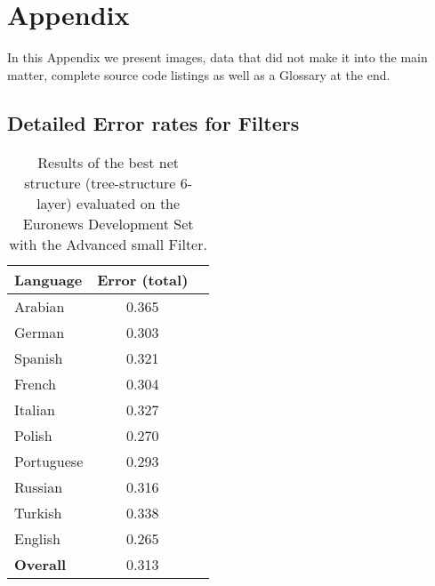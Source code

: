 


\chapter{Appendix}
\label{chap:appendix}
In this Appendix we present images, data that did not make it into the main matter, complete source code listings as well as a Glossary at the end.

\section{Detailed Error rates for Filters}

\begin{table}[!htbp]
\centering
\caption{Results of the best net structure (tree-structure 6-layer) evaluated on the Euronews Development Set with the Advanced small Filter.}
\label{tab:advanced}
\begin{tabular}{| l | c | r | }
	\hline
	\textbf{Language} & \textbf{Error (total)}  \\
	\hline
	Arabian & 0.365  \\
	German & 0.303  \\
	Spanish & 0.321 \\ 
	French & 0.304 \\
	Italian & 0.327  \\
	Polish & 0.270 \\
	Portuguese& 0.293  \\
	Russian&  0.316 \\
	Turkish&  0.338 \\
	English&  0.265 \\
	\hline
	\textbf{Overall} & 0.313 \\
	\hline
\end{tabular}
\end{table}

